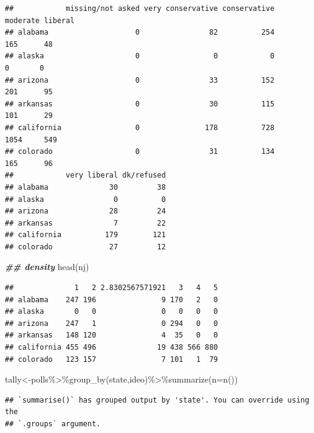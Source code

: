 \documentclass[
]{book}
\newenvironment{Shaded}{\begin{snugshade}}{\end{snugshade}}
\newcommand{\AttributeTok}[1]{\textcolor[rgb]{0.77,0.63,0.00}{#1}}
\newcommand{\DocumentationTok}[1]{\textcolor[rgb]{0.56,0.35,0.01}{\textbf{\textit{#1}}}}
\newcommand{\FunctionTok}[1]{\textcolor[rgb]{0.00,0.00,0.00}{#1}}
\newcommand{\NormalTok}[1]{#1}
\newcommand{\OtherTok}[1]{\textcolor[rgb]{0.56,0.35,0.01}{#1}}
\newcommand{\SpecialCharTok}[1]{\textcolor[rgb]{0.00,0.00,0.00}{#1}}
\theoremstyle{definition}
\theoremstyle{definition}
\theoremstyle{definition}
\theoremstyle{definition}
\theoremstyle{remark}
\begin{document}
\begin{verbatim}
##            missing/not asked very conservative conservative moderate liberal
## alabama                    0                82          254      165      48
## alaska                     0                 0            0        0       0
## arizona                    0                33          152      201      95
## arkansas                   0                30          115      101      29
## california                 0               178          728     1054     549
## colorado                   0                31          134      165      96
##            very liberal dk/refused
## alabama              30         38
## alaska                0          0
## arizona              28         24
## arkansas              7         22
## california          179        121
## colorado             27         12
\end{verbatim}

\begin{Shaded}
\begin{Highlighting}[]
\DocumentationTok{\#\# density}
\FunctionTok{head}\NormalTok{(nj)}
\end{Highlighting}
\end{Shaded}

\begin{verbatim}
##              1   2 2.8302567571921   3   4   5
## alabama    247 196               9 170   2   0
## alaska       0   0               0   0   0   0
## arizona    247   1               0 294   0   0
## arkansas   148 120               4  35   0   0
## california 455 496              19 438 566 880
## colorado   123 157               7 101   1  79
\end{verbatim}

\begin{Shaded}
\begin{Highlighting}[]
\NormalTok{ tally}\OtherTok{\textless{}{-}}\NormalTok{polls}\SpecialCharTok{\%\textgreater{}\%}\FunctionTok{group\_by}\NormalTok{(state,ideo)}\SpecialCharTok{\%\textgreater{}\%}\FunctionTok{summarize}\NormalTok{(}\AttributeTok{n=}\FunctionTok{n}\NormalTok{())}
\end{Highlighting}
\end{Shaded}

\begin{verbatim}
## `summarise()` has grouped output by 'state'. You can override using the
## `.groups` argument.
\end{verbatim}
\end{document}
